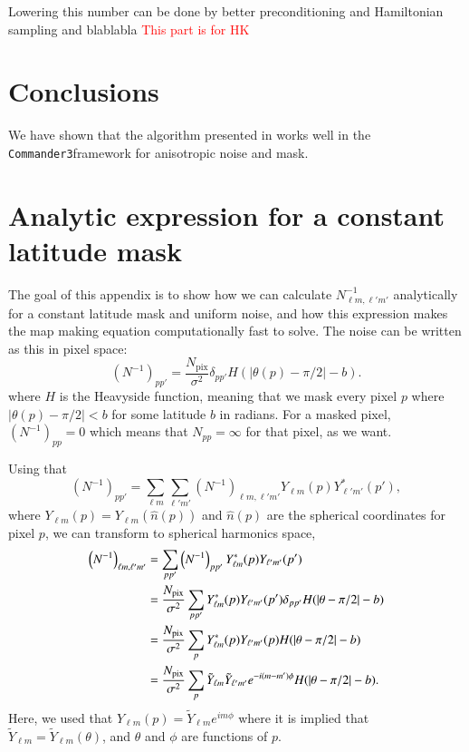 \documentclass[twocolumn]{../common/aa}
\def\commanderthree{\texttt{Commander3}}
\begin{document}
Lowering this number can be done by better preconditioning and Hamiltonian sampling and blablabla \textcolor{red}{This part is for HK}

\section{Conclusions}
\label{sec:conclusions}

We have shown that the algorithm presented in \cite{racine:2016} works well in the \commanderthree framework for anisotropic noise and mask.





\appendix

\section{Analytic expression for a constant latitude mask}
\label{sec:appendixA}


The goal of this appendix is to show how we can calculate $N_{\ell m, \ell' m'}^{-1}$ analytically for a constant latitude mask and uniform noise, and how this expression makes the map making equation computationally fast to solve. The noise can be written as this in pixel space:
$$
\left(N^{-1} \right)_{pp'} = \frac{N_{\mathrm{pix}}}{\sigma^2} \delta_{pp'} H(|\theta(p) -\pi/2|-b).
$$
where $H$ is the Heavyside function, meaning that we mask every pixel $p$ where $|\theta(p) -\pi/2| < b$ for some latitude $b$ in radians. For a masked pixel, $\left(N^{-1} \right)_{pp}=0$ which means that $N_{pp} = \infty$ for that pixel, as we want.

Using that
$$
\left(N^{-1}\right)_{pp'} = \sum_{\ell m}\sum_{\ell' m'} \left(N^{-1}\right)_{\ell m, \ell'm'} Y_{\ell m}\left(p\right)Y^*_{\ell' m'}\left(p'\right),
$$
where $Y_{\ell m}\left(p\right) = Y_{\ell m}\left(\hat{n}(p)\right)$ and $\hat{n}(p)$ are the spherical coordinates for pixel $p$, we can transform to spherical harmonics space,
\begin{align}
\nonumber
\left(N^{-1}\right)_{\ell m, \ell' m'} &= \sum_{p p'}\left(N^{-1}\right)_{pp'}Y^{*}_{\ell m}(p)Y_{\ell' m'}(p')\\
\nonumber
&= \frac{N_{\mathrm{pix}}}{\sigma^2}\sum_{p p'} Y^{*}_{\ell m}(p)Y_{\ell' m'}(p') \delta_{pp'} H(|\theta -\pi/2|-b)\\
\nonumber
&= \frac{N_{\mathrm{pix}}}{\sigma^2}\sum_{p } Y^{*}_{\ell m}(p)Y_{\ell' m'}(p) H(|\theta -\pi/2|-b)\\
&= \frac{N_{\mathrm{pix}}}{\sigma^2}\sum_p \Tilde{Y}_{\ell m}\Tilde{Y}_{\ell' m'} e^{-i(m-m')\phi} H(|\theta -\pi/2|-b).
\end{align}
Here, we used that $Y_{\ell m}(p) = \tilde{Y}_{\ell m} e^{im\phi}$ where it is implied that $\tilde{Y}_{\ell m}=\tilde{Y}_{\ell m}(\theta)$, and $\theta$ and $\phi$ are functions of $p$.
\end{document}
